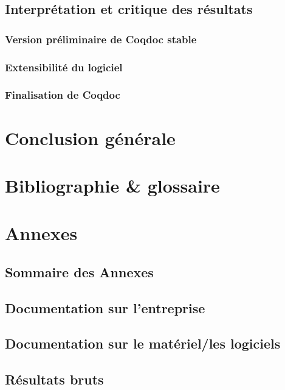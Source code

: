 \documentclass[a4paper, 11pt]{report}
\begin{document}
  \section{Interprétation et critique des résultats}
    \subsection{Version préliminaire de Coqdoc stable}
    \subsection{Extensibilité du logiciel}
    \subsection{Finalisation de Coqdoc}
\chapter{Conclusion générale}
\chapter{Bibliographie \& glossaire}
\chapter{Annexes}
  \section{Sommaire des Annexes}
  \section{Documentation sur l'entreprise}
  \section{Documentation sur le matériel/les logiciels}
  \section{Résultats bruts}
\end{document}
